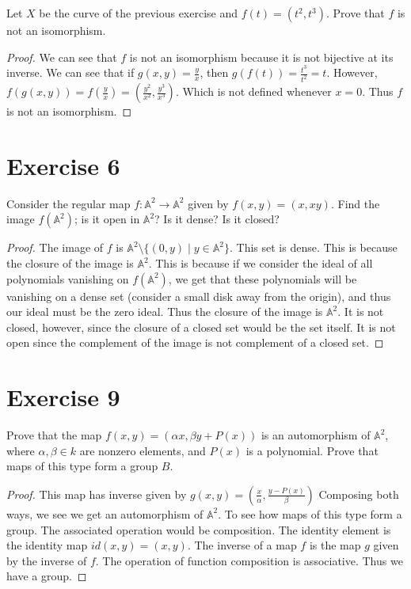 \documentclass[12pt]{article}
\begin{document}
Let $X$ be the curve of the previous exercise and $f(t) = (t^2,t^3)$. Prove that $f$ is not an
isomorphism.

\begin{proof}

  We can see that $f$ is not an isomorphism because it is not bijective at its inverse. We can see
  that if $g(x,y) = \frac{y}{x}$, then $g(f(t)) = \frac{t^3}{t^2} = t$. However, 
  $f(g(x,y)) = f(\frac{y}{x}) = (\frac{y^2}{x^2},\frac{y^3}{x^3})$. Which is not defined whenever
  $x=0$. Thus $f$ is not an isomorphism.

\end{proof}


\section*{Exercise 6}

Consider the regular map $f: \mathbb{A}^2 \rightarrow \mathbb{A}^2$ given by $f(x,y) = (x,xy)$. Find
the image $f(\mathbb{A}^2)$; is it open in $\mathbb{A}^2$? Is it dense? Is it closed?


\begin{proof}

  The image of $f$ is $\mathbb{A}^2 \setminus \{(0,y) \mid y \in \mathbb{A}^2\}$. This set is dense.
  This is because the closure of the image is $\mathbb{A}^2$. This is because if we
  consider the ideal of all polynomials vanishing on $f(\mathbb{A}^2)$, we get that these
  polynomials will be vanishing on a dense set (consider a small disk away from the origin), 
  and thus our ideal must be the zero ideal. Thus the closure of the image is $\mathbb{A}^2$. It is
  not closed, however, since the closure of a closed set would be the set itself. It is not open
  since the complement of the image is not complement of a closed set.

\end{proof}


\section*{Exercise 9}

Prove that the map $f(x,y) = (\alpha x , \beta y + P(x))$ is an automorphism of $\mathbb{A}^2$,
where $\alpha, \beta \in k$ are nonzero elements, and $P(x)$ is a polynomial. Prove that maps of
this type form a group $B$.

\begin{proof} 

  This map has inverse given by $g(x,y) = \left( \frac{x}{\alpha} , \frac{y - P(x)}{\beta} \right)$
  Composing both ways, we see we get an automorphism of $\mathbb{A}^2$. To see how maps of this type
  form a group. The associated operation would be composition. The identity element is the identity
  map $id(x,y) = (x,y)$. The inverse of a map $f$ is the map $g$ given by the inverse of $f$. The
  operation of function composition is associative. Thus we have a group.

\end{proof}
\end{document}
